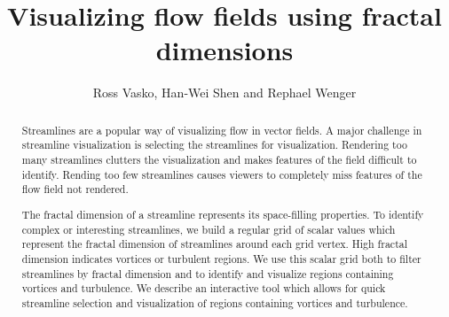\documentclass{egpubl}
\title{Visualizing flow fields using fractal dimensions}
\author{Ross Vasko, Han-Wei Shen and Rephael Wenger}
\begin{document}
\maketitle

\begin{abstract}
Streamlines are a popular way of visualizing flow in vector fields.
A major challenge in streamline visualization is selecting the streamlines
for visualization.
Rendering too many streamlines clutters the visualization and makes
features of the field difficult to identify. 
Rending too few streamlines causes viewers to completely miss features
of the flow field not rendered. 

The fractal dimension of a streamline represents its space-filling properties.
To identify complex or interesting streamlines, 
we build a regular grid of scalar values 
which represent the fractal dimension of streamlines around each grid vertex.
High fractal dimension indicates vortices or turbulent regions.
We use this scalar grid both to filter streamlines by fractal dimension
and to identify and visualize regions containing vortices and turbulence.
We describe an interactive tool which allows for quick streamline selection
and visualization of regions containing vortices and turbulence.
\end{abstract}







\renewcommand{\textfraction}{0.2}
\renewcommand{\dbltopfraction}{0.8}	
\renewcommand{\topfraction}{0.8}	


\end{document}
